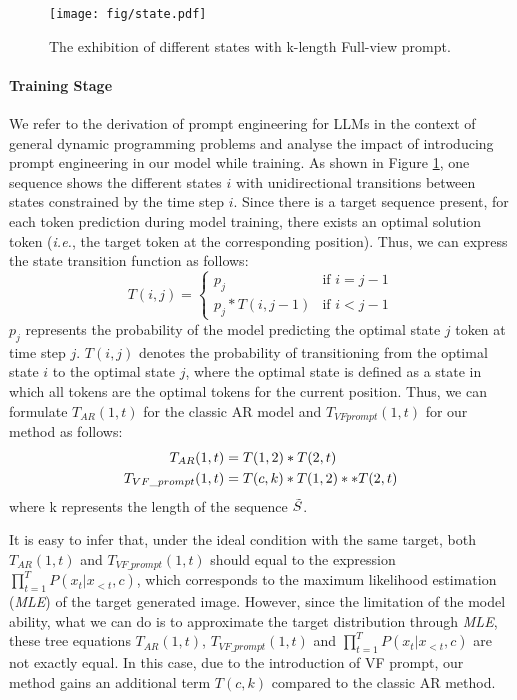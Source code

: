 \begin{figure}[t]
  \centering
    \texttt{[image: fig/state.pdf]}
   \caption{The exhibition of different states with k-length Full-view prompt.}
   \label{fig:state}
\end{figure}

\paragraph{Training Stage} We refer to the derivation of prompt engineering for LLMs in the context of general dynamic programming problems and analyse the impact of introducing prompt engineering in our model while training. As shown in Figure \ref{fig:state}, one sequence shows the different states $i$ with unidirectional transitions between states constrained by the time step $i$. Since there is a target sequence present, for each token prediction during model training, there exists an optimal solution token (\textit{i.e.}, the target token at the corresponding position). Thus, we can express the state transition function as follows:
\begin{equation}
    T(i,j)=
    \begin{cases}
        p_j & \text{if } i=j-1 \\
        p_j*T(i,j-1) & \text{if } i<j-1
    \end{cases}
\end{equation}
$p_j$ represents the probability of the model predicting the optimal state $j$ token at time step $j$. $T(i,j)$ denotes the probability of transitioning from the optimal state $i$ to the optimal state $j$, where the optimal state is defined as a state in which all tokens are the optimal tokens for the current position. Thus, we can formulate $T_{AR}(1,t)$ for the classic AR model and $T_{VF prompt}(1,t)$ for our method as follows:
\begin{align}
\small
   T_{AR}(1,t) &= T(1,2)*T(2,t) \\
    T_{VF\_prompt}(1,t) &= T(c,k)*T(1,2)**T(2,t)
\end{align}
where k represents the length of the sequence $\Tilde{S}$.

It is easy to infer that, under the ideal condition with the same target, both $T_{AR}(1,t)$ and $T_{VF\_prompt}(1,t)$ should equal to the expression $\prod^{T}_{t=1}P(x_t|x_{<t},c)$, which corresponds to the maximum likelihood estimation (\textit{MLE}) of the target generated image. However, since the limitation of the model ability, what we can do is to approximate the target distribution through \textit{MLE}, these tree equations $T_{AR}(1,t)$, $T_{VF\_prompt}(1,t)$ and $\prod^{T}_{t=1}P(x_t|x_{<t},c)$ are not exactly equal. In this case, due to the introduction of VF prompt, our method gains an additional term $T(c,k)$ compared to the classic AR method.

